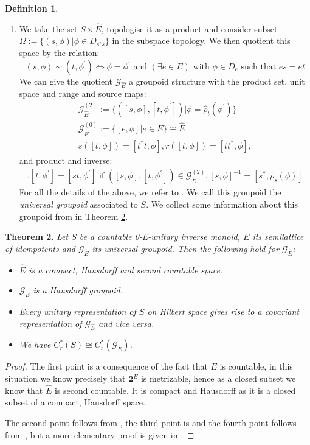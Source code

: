 \documentclass[11pt,]{amsbook}
\theoremstyle{plain}
\newtheorem{theorem}{Theorem}%
\theoremstyle{definition}%
\newtheorem{definition}[theorem]{Definition}%
\theoremstyle{remark}%
\newcommand{\G}{\mathcal{G}}
\newcommand{\E}{\widehat{E}}
\begin{document}
\begin{definition}
\begin{enumerate}
\item We take the set $S \times \E$, topologise it as a product and consider subset $\Omega:= \lbrace (s, \phi) | \phi \in D_{s^{*}s} \rbrace$ in the subspace topology. We then quotient this space by the relation:
\begin{equation*}
(s, \phi) \sim (t, \phi^{'}) \Leftrightarrow \phi=\phi^{'} \mbox{ and } (\exists e \in E) \mbox{ with } \phi \in D_{e} \mbox{ such that } es=et
\end{equation*}
We can give the quotient $\G_{\E}$ a groupoid structure with the product set, unit space and range and source maps:
\begin{eqnarray*}
\G_{\E}^{(2)}:=\lbrace ([s,\phi],[t,\phi^{'}]) | \phi=\widehat{\rho}_{t}(\phi^{'}) \rbrace \\
\G_{\E}^{(0)}:= \lbrace [e,\phi] | e \in E \rbrace \cong \E \\
s([t,\phi])=[t^{*}t,\phi], r([t,\phi])=[tt^{*},\phi], 
\end{eqnarray*}
and product and inverse:
\begin{eqnarray*}
[s,\phi].[t,\phi^{'}]= [st,\phi^{'}] \mbox{ if } ([s,\phi],[t,\phi^{'}]) \in \G_{\E}^{(2)}, [s,\phi]^{-1} = [s^{*},\widehat{\rho}_{s}(\phi)] 
\end{eqnarray*}
For all the details of the above, we refer to \cite[Section 4]{MR2419901}. We call this groupoid the \textit{universal groupoid} associated to $S$. We collect some information about this groupoid from \cite{MR2419901,MR1724106} in Theorem \ref{Thm:Info}.
\end{enumerate}
\end{definition}

\begin{theorem}\label{Thm:Info}
Let $S$ be a countable 0-E-unitary inverse monoid, $E$ its semilattice of idempotents and $\G_{\E}$ its universal groupoid. Then the following hold for $\G_{\E}$:
\begin{itemize}
\item $\E$ is a compact, Hausdorff and second countable space.
\item $\G_{\E}$ is a Hausdorff groupoid.
\item Every unitary representation of $S$ on Hilbert space gives rise to a covariant representation of $\G_{\E}$ and vice versa.
\item We have $C^{*}_{r}(S) \cong C^{*}_{r}(\G_{\E})$.
\end{itemize}
\end{theorem}
\begin{proof}
The first point is a consequence of the fact that $E$ is countable, in this situation we know precisely that $\textbf{2}^{E}$ is metrizable, hence as a closed subset we know that $\E$ is second countable. It is compact and Hausdorff as it is a closed subset of a compact, Hausdorff space.

The second point follows from \cite[Corollary 10.9]{MR2419901}, the third point is \cite[Corollary 10.16]{MR2419901} and the fourth point follows from \cite[Theorem ...]{MR1724106}, but a more elementary proof is given in \cite{MR1900993}.
\end{proof}
\end{document}
